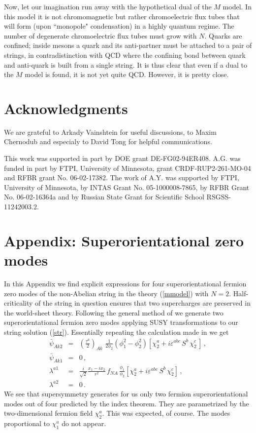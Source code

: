 \documentclass[epsfig,12pt]{article}
\def\beqn{\begin{eqnarray}}
\def\eeqn{\end{eqnarray}}
\renewcommand{\theequation}{\thesection.\arabic{equation}}
\begin{document}
Now, let our imagination run away with the hypothetical dual of the 
$M$ model. In this model it is not chromomagnetic but
rather chromoelectric flux tubes that will form (upon ``monopole" condensation)
in a highly quantum regime. The number of degenerate 
chromoelectric flux tubes must grow with $N$. 
Quarks are confined; inside mesons a quark and its anti-partner must be attached
to a pair of strings, in contradistinction with QCD
where the confining bond between
quark and anti-quark is built from a single string.
It is thus clear that even if a dual to the $M$ model is found,
it is not yet quite QCD. However, it is pretty close.

 \section*{Acknowledgments}

We are grateful to Arkady Vainshtein for useful discussions, to Maxim Chernodub
 and especialy to David Tong for helpful communications.

This work was supported in part by DOE grant DE-FG02-94ER408.
A.G.  was funded in part by FTPI, University of Minnesota,
 grant CRDF-RUP2-261-MO-04 and RFBR grant No. 06-02-17382.
The work of A.Y. was  supported 
by  FTPI, University of Minnesota, by INTAS Grant No. 05-1000008-7865,
by RFBR Grant No. 06-02-16364a 
and by Russian State Grant for 
Scientific School RSGSS-11242003.2.







\section*{Appendix: Superorientational zero modes}
\renewcommand{\theequation}{A.\arabic{equation}}
\setcounter{equation}{0}

In this Appendix we find  explicit expressions for four superorientational
fermion zero modes of the non-Abelian string in  the theory (\ref{mmodel}) with
$N=2$.  Half-criticality of the string in question ensures that two
supercharges are preserved in the world-sheet theory. Following the general
method of \cite{SYmon,SYnone} we generate two superorientational fermion
zero modes applying SUSY transformations to our string solution (\ref{str}).
Essentially repeating  the calculation made in \cite{SYnone} we get
\beqn
\bar{\psi}_{Ak\dot{2}}
& = &
\left(\frac{\tau^a}{2}\right)_{Ak}\,\,
\frac1{2\phi_2}(\phi_1^2-\phi_2^2)
\left[
\chi_2^a
+i\varepsilon^{abc}\, S^b\, \chi^c_2\,
\right]\, ,
\nonumber\\[3mm]
\bar{\psi}_{Ak\dot{1}}
& = &
0\, ,
\nonumber\\[4mm]
\lambda^{a1}
& = &
\frac{i}{\sqrt{2}}\frac{x_1-ix_2}{r^2}
\, f_{NA}\, \frac{\phi_1}{\phi_2}
\left[
\chi^a_2
+i\varepsilon^{abc}\, S^b\, \chi^c_2
\right]\,,
\nonumber\\[4mm]
\lambda^{a2}
& = & 0
\, .
\label{nonemodes}
\eeqn
We see that  supersymmetry generates for  us  only two fermion
superorientational modes  out of four predicted by the index theorem.
They are parametrized by
the  two-dimensional fermion field
$\chi_2^a$.
This was expected, of course. The modes proportional to $\chi^a_1$ do not appear.
\end{document}
